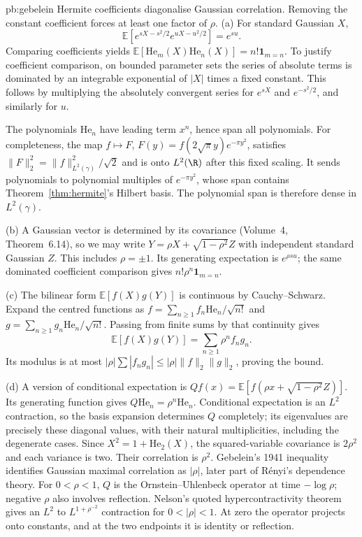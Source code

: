 \begin{solution}{pb:gebelein}
\idea Hermite coefficients diagonalise Gaussian correlation. Removing the constant coefficient forces at least one factor of $\rho$.
\writeup (a) For standard Gaussian $X$,
\[\mathbb E[e^{sX-s^2/2}e^{uX-u^2/2}]=e^{su}.
\]
Comparing coefficients yields $\mathbb E[\mathrm{He}_m(X)\mathrm{He}_n(X)]=n!\mathbf1_{m=n}$. To justify coefficient comparison, on bounded parameter sets the series of absolute terms is dominated by an integrable exponential of $|X|$ times a fixed constant. This follows by multiplying the absolutely convergent series for $e^{sX}$ and $e^{-s^2/2}$, and similarly for $u$.

The polynomials $\mathrm{He}_n$ have leading term $x^n$, hence span all polynomials. For completeness, the map $f\mapsto F$, $F(y)=f(2\sqrt\pi y)e^{-\pi y^2}$, satisfies $\|F\|_2^2=\|f\|_{L^2(\gamma)}^2/\sqrt2$ and is onto $L^2(\R)$ after this fixed scaling. It sends polynomials to polynomial multiples of $e^{-\pi y^2}$, whose span contains Theorem~\ref{thm:hermite}'s Hilbert basis. The polynomial span is therefore dense in $L^2(\gamma)$.

(b) A Gaussian vector is determined by its covariance (Volume~4, Theorem~6.14), so we may write $Y=\rho X+\sqrt{1-\rho^2}Z$ with independent standard Gaussian $Z$. This includes $\rho=\pm1$. Its generating expectation is $e^{\rho su}$; the same dominated coefficient comparison gives $n!\rho^n\mathbf1_{m=n}$.

(c) The bilinear form $\mathbb E[f(X)g(Y)]$ is continuous by Cauchy--Schwarz. Expand the centred functions as $f=\sum_{n\ge1}f_n\mathrm{He}_n/\sqrt{n!}$ and $g=\sum_{n\ge1}g_n\mathrm{He}_n/\sqrt{n!}$. Passing from finite sums by that continuity gives
\[\mathbb E[f(X)g(Y)]=\sum_{n\ge1}\rho^nf_ng_n.
\]
Its modulus is at most $|\rho|\sum|f_ng_n|\le|\rho|\|f\|_2\|g\|_2$, proving the bound.

(d) A version of conditional expectation is $Qf(x)=\mathbb E[f(\rho x+\sqrt{1-\rho^2}Z)]$. Its generating function gives $Q\mathrm{He}_n=\rho^n\mathrm{He}_n$. Conditional expectation is an $L^2$ contraction, so the basis expansion determines $Q$ completely; its eigenvalues are precisely these diagonal values, with their natural multiplicities, including the degenerate cases. Since $X^2=1+\mathrm{He}_2(X)$, the squared-variable covariance is $2\rho^2$ and each variance is two. Their correlation is $\rho^2$.
\leads Gebelein's 1941 inequality identifies Gaussian maximal correlation as $|\rho|$, later part of R\'enyi's dependence theory. For $0<\rho<1$, $Q$ is the Ornstein--Uhlenbeck operator at time $-\log\rho$; negative $\rho$ also involves reflection. Nelson's quoted hypercontractivity theorem gives an $L^2$ to $L^{1+\rho^{-2}}$ contraction for $0<|\rho|<1$. At zero the operator projects onto constants, and at the two endpoints it is identity or reflection.
\end{solution}

